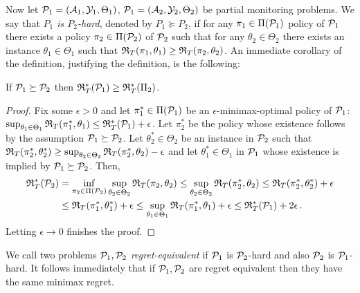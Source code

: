 Now let $\P_1 = (\A_1,\Y_1,\Theta_1)$, $\P_1 = (\A_2,\Y_2,\Theta_2)$ be partial monitoring problems.
We say that \emph{$P_1$ is $P_2$-hard}, 
denoted by $P_1 \succeq P_2$, if for any $\pi_1\in \Pi(\P_1)$ policy of $\P_1$ there exists a policy $\pi_2\in \Pi(\P_2)$ of $\P_2$
such that for any $\theta_2\in \Theta_2$ there exists an instance $\theta_1\in \Theta_1$ such that $\Regret_T(\pi_1,\theta_1)\ge \Regret_T(\pi_2,\theta_2)$. An immediate corollary of the definition, justifying the definition, is the following:
\begin{prop}
If $\P_1\succeq \P_2$ then $\Regret_T^*(\P_1)\ge \Regret_T^*(\Pi_2)$.
\end{prop}
\begin{proof}
Fix some $\epsilon>0$ and 
let $\pi_1^*\in \Pi(\P_1)$ be an $\epsilon$-minimax-optimal policy of $\P_1$: 
$\sup_{\theta_1\in\Theta_1} \Regret_T(\pi_1^*,\theta_1) \le \Regret_T^*(\P_1)+\epsilon$.
Let $\pi_2^*$ be the policy whose existence follows by the assumption $\P_1\succeq \P_2$.
Let $\theta_2^*\in \Theta_2$ be an instance in $\P_2$ such that 
$\Regret_T(\pi_2^*,\theta_2^*)\ge \sup_{\theta_2\in \Theta_2} \Regret_T(\pi_2^*,\theta_2)-\epsilon$
and let $\theta_1^*\in \Theta_1$ in $\P_1$ whose existence is implied by $\P_1\succeq \P_2$.
Then,
\begin{align*}
 \Regret_T^*(\P_2) &= 
\inf_{\pi_2\in \Pi(\P_2)} \sup_{\theta_2\in \Theta_2} \Regret_T(\pi_2,\theta_2)
\le \sup_{\theta_2\in \Theta_2} \Regret_T(\pi_2^*,\theta_2) 
\le  \Regret_T(\pi_2^*,\theta_2^*)+\epsilon \\
& \le  \Regret_T(\pi_1^*,\theta_1^*)+\epsilon
\le \sup_{\theta_1\in \Theta_1} \Regret_T(\pi_1^*,\theta_1)+\epsilon
\le \Regret_T^*(\P_1) +2\epsilon\,.
\end{align*}
Letting $\epsilon\to 0$ finishes the proof.
\end{proof}
We call two problems \emph{$\P_1,\P_2$ regret-equivalent} if $\P_1$ is $\P_2$-hard and also $\P_2$ is $\P_1$-hard.
It follows immediately that if $\P_1,\P_2$ are regret equivalent then they have the same minimax regret.

